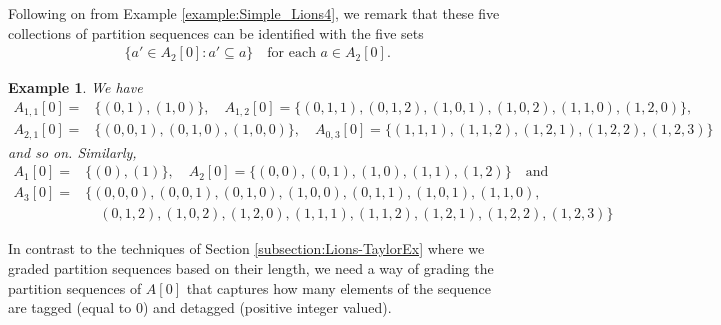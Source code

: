 \documentclass[a4paper,11pt,twoside]{article}
\numberwithin{equation}{section}
\theoremstyle{plain}
\newtheorem{example}[theorem]{Example}
\newcommand{\1}{\mathbbm{1}}
\begin{document}
	Following on from Example \ref{example:Simple_Lions4}, we remark that these five collections of partition sequences can be identified with the five sets
	\begin{align*}
		\Big\{ a' \in A_2[0]: a' \subseteq a \Big\} \quad \mbox{for each $a\in A_2[0]$. }
	\end{align*}
	
	\begin{example}
		We have
		\begin{align*}
			A_{1,1}[0] =& \Big\{ (0,1), (1,0) \Big\}, 
			\quad 
			A_{1,2}[0] = \Big\{ (0,1,1), (0,1,2), (1,0,1), (1,0,2), (1,1,0), (1,2,0) \Big\}, 
			\\
			A_{2,1}[0] =& \Big\{ (0,0,1), (0,1,0), (1,0,0) \Big\}, 
			\quad
			A_{0,3}[0] = \Big\{ (1,1,1), (1,1,2), (1,2,1), (1,2,2), (1,2,3) \Big\}
		\end{align*}
		and so on. Similarly, 
		\begin{align*}
			A_1[0] =& \Big\{ (0), (1) \}, 
			\quad 
			A_2[0] = \Big\{ (0,0), (0,1), (1, 0), (1,1), (1,2) \Big\} \quad\mbox{and}
			\\
			A_3[0] =& \Big\{ (0,0,0), (0,0,1), (0,1,0), (1,0,0), (0,1,1), (1,0,1), (1,1,0), 
			\\
			&\quad (0,1,2), (1,0,2), (1,2,0), (1,1,1), (1,1,2), (1,2,1), (1,2,2), (1,2,3) \Big\}
		\end{align*}
	\end{example}
	
	In contrast to the techniques of Section \ref{subsection:Lions-TaylorEx} where we graded partition sequences based on their length, we need a way of grading the partition sequences of $A[0]$ that captures how many elements of the sequence are tagged (equal to 0) and detagged (positive integer valued). 
	
\end{document}
